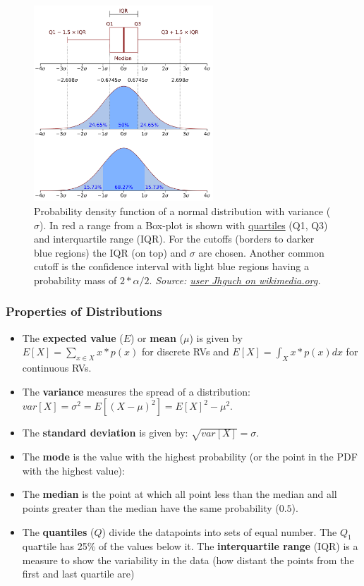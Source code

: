 \documentclass[
]{book}
\begin{document}
\begin{figure}
\hypertarget{Boxplot}{%
\centering
\includegraphics[width=0.6\textwidth,height=\textheight]{./figures/Boxplot_vs_PDF.png}
\caption{Probability density function of a normal distribution with variance
(\(\sigma\)). In red a range from a Box-plot is shown with
\protect\hyperlink{dist_prop}{quartiles} (Q1, Q3) and interquartile range (IQR). For the
cutoffs (borders to darker blue regions) the IQR (on top) and \(\sigma\)
are chosen. Another common cutoff is the confidence interval with light
blue regions having a probability mass of \(2 * \alpha / 2\). \emph{Source:
\href{https://commons.wikimedia.org/wiki/File:Boxplot_vs_PDF.svg}{user Jhguch on
wikimedia.org}.}}\label{Boxplot}
}
\end{figure}

\hypertarget{dist_prop}{%
\subsubsection{Properties of Distributions}\label{dist_prop}}

\begin{itemize}
\item
  The \textbf{expected value} (\(E\)) or \textbf{mean} (\(\mu\)) is given by
  \(E[X] = \sum_{x \in X} x*p(x)\) for discrete RVs and
  \(E[X] = \int_X x*p(x) dx\) for continuous RVs.
\item
  The \textbf{variance} measures the spread of a distribution:
  \(var[X] = \sigma^2 = E[(X-\mu)^2] = E[X]^2 - \mu^2\).
\item
  The \textbf{standard deviation} is given by: \(\sqrt{var[X]} = \sigma\).
\item
  The \textbf{mode} is the value with the highest probability (or the point
  in the PDF with the highest value):
\item
  The \textbf{median} is the point at which all point less than the median
  and all points greater than the median have the same probability
  (\(0.5\)).
\item
  The \textbf{quantiles} (\(Q\)) divide the datapoints into sets of equal
  number. The \(Q_1\) qua\textbf{r}tile has 25\% of the values below it. The
  \textbf{interquartile range} (IQR) is a measure to show the variability
  in the data (how distant the points from the first and last quartile
  are)
\end{itemize}
\end{document}
